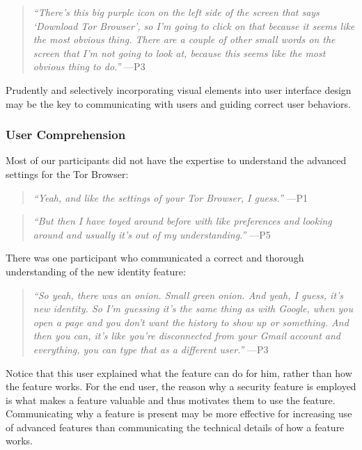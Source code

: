 \documentclass[letterpaper,twocolumn,11pt]{article}
\begin{document}
\begin{quote}{\it
``There's this big purple icon on the left side of the screen that says `Download Tor Browser',
so I'm going to click on that because it seems like the most obvious thing.
There are a couple of other small words on the screen that I'm not going to look at, because this seems like the most obvious thing to do.''} \mbox{---P3}
\end{quote}

Prudently and selectively incorporating visual elements into user interface design may be the key to 
communicating with users and guiding correct user behaviors.

\subsubsection{User Comprehension} 

Most of our participants did not have the expertise to understand 
the advanced settings for the Tor Browser: 

\begin{quote}{\it
``Yeah, and like the settings of your Tor Browser, I guess.''} \mbox{---P1}
\end{quote}

\begin{quote}{\it
``But then I have toyed around before with like preferences and looking around and 
usually it's out of my understanding.''} \mbox{---P5}
\end{quote}

There was one participant who communicated a correct and thorough understanding of the 
new identity feature: 

\begin{quote}{\it
``So yeah, there was an onion. Small green onion. And yeah, I guess, it's new identity.
So I'm guessing it's the same thing as with Google, when you open a page and you don't 
want the history to show up or something. And then you can, it's like you're disconnected 
from your Gmail account and everything, you can type that as a different user.''} \mbox{---P3} 
\end{quote}

Notice that this user explained what the feature can do for him, rather than how the 
feature works. For the end user, the reason why a security feature is employed is what 
makes a feature valuable and thus motivates them to use the feature. Communicating why a 
feature is present may be more effective for increasing use of advanced features 
than communicating the technical details of how a feature works. 
\end{document}

